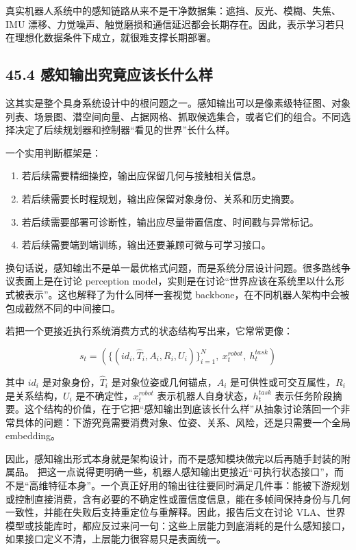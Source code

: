 真实机器人系统中的感知链路从来不是干净数据集：遮挡、反光、模糊、失焦、IMU 漂移、力觉噪声、触觉磨损和通信延迟都会长期存在。因此，表示学习若只在理想化数据条件下成立，就很难支撑长期部署。

\subsection*{45.4 感知输出究竟应该长什么样}


这其实是整个具身系统设计中的根问题之一。感知输出可以是像素级特征图、对象列表、场景图、潜空间向量、占据网格、抓取候选集合，或者它们的组合。不同选择决定了后续规划器和控制器“看见的世界”长什么样。

一个实用判断框架是：

\begin{enumerate}
\item 若后续需要精细操控，输出应保留几何与接触相关信息。
\item 若后续需要长时程规划，输出应保留对象身份、关系和历史摘要。
\item 若后续需要部署可诊断性，输出应尽量带置信度、时间戳与异常标记。
\item 若后续需要端到端训练，输出还要兼顾可微与可学习接口。
\end{enumerate}

换句话说，感知输出不是单一最优格式问题，而是系统分层设计问题。很多路线争议表面上是在讨论 perception model，实则是在讨论“世界应该在系统里以什么形式被表示”。这也解释了为什么同样一套视觉 backbone，在不同机器人架构中会被包成截然不同的中间接口。

若把一个更接近执行系统消费方式的状态结构写出来，它常常更像：

\begingroup
\scriptsize
\begin{equation*}
s_t = \left(\{(id_i, \hat{T}_i, A_i, R_i, U_i)\}_{i=1}^{N},\ x_t^{robot},\ h_t^{task}\right)
\end{equation*}
\endgroup

其中 \(id_i\) 是对象身份，\(\hat{T}_i\) 是对象位姿或几何锚点，\(A_i\) 是可供性或可交互属性，\(R_i\) 是关系结构，\(U_i\) 是不确定性，\(x_t^{robot}\) 表示机器人自身状态，\(h_t^{task}\) 表示任务阶段摘要。这个结构的价值，在于它把“感知输出到底该长什么样”从抽象讨论落回一个非常具体的问题：下游究竟需要消费对象、位姿、关系、风险，还是只需要一个全局 embedding。

因此，感知输出形式本身就是架构设计，而不是感知模块做完以后再随手封装的附属品。 把这一点说得更明确一些，机器人感知输出更接近“可执行状态接口”，而不是“高维特征本身”。一个真正好用的输出往往要同时满足几件事：能被下游规划或控制直接消费，含有必要的不确定性或置信度信息，能在多帧间保持身份与几何一致性，并能在失败后支持重定位与重解释。因此，报告后文在讨论 VLA、世界模型或技能库时，都应反过来问一句：这些上层能力到底消耗的是什么感知接口，如果接口定义不清，上层能力很容易只是表面统一。


